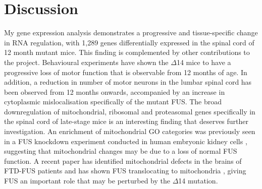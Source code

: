 \section{Discussion}
My gene expression analysis demonstrates a progressive and tissue-specific change in RNA regulation, with 1,289 genes differentially expressed in the spinal cord of 12 month mutant mice. This finding is complemented by other contributions to the project. Behavioural experiments have shown the $\Delta$14 mice to have a progressive loss of motor function that is observable from 12 months of age. In addition, a reduction in number of motor neurons in the lumbar spinal cord has been observed from 12 months onwards, accompanied by an increase in cytoplasmic mislocalisation specifically of the mutant FUS.
The broad downregulation of mitochondrial, ribosomal and proteasomal genes specifically in the spinal cord of late-stage mice is an interesting finding that deserves further investigation. An enrichment of mitochondrial GO categories was previously seen in a FUS knockdown experiment conducted in human embryonic kidney cells  \citep{Schwartz2012}, suggesting that mitochondrial changes may be due to a loss of normal FUS function. A recent paper has identified mitochondrial defects in the brains of FTD-FUS patients and has shown FUS translocating to mitochondria \citep{Deng2015}, giving FUS an important role that may be perturbed by the $\Delta$14 mutation.
